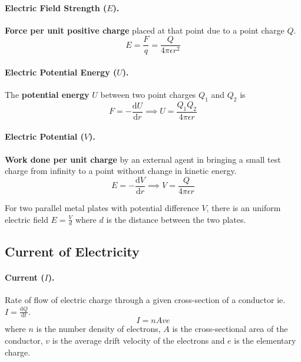 \documentclass{article}
\begin{document}
\paragraph{Electric Field Strength ($E$).} \textbf{Force per unit positive
charge} placed at that point due to a point charge $Q$. \begin{equation} E =
\frac{F}{q} = \frac{Q}{4\pi\epsilon r^2} \end{equation}

\paragraph{Electric Potential Energy ($U$).} The \textbf{potential energy} $U$
between two point charges $Q_1$ and $Q_2$ is \begin{equation} F =
-\frac{\mathrm{d}U}{\mathrm{d}r} \implies U = \frac{Q_1Q_2}{4\pi\epsilon r}
\end{equation}

\paragraph{Electric Potential ($V$).} \textbf{Work done per unit charge} by an
external agent in bringing a small test charge from infinity to a point without
change in kinetic energy. \begin{equation} E = -\frac{\mathrm{d}V}{\mathrm{d}r}
  \implies V = \frac{Q}{4\pi\epsilon r} \end{equation}

For two parallel metal plates with potential difference $V$, there is an uniform
electric field $E = \frac{V}{d}$ where $d$ is the distance between the two
plates.

\subsection{Current of Electricity}

\paragraph{Current ($I$).} Rate of flow of electric charge through a given
cross-section of a conductor ie. $I = \frac{\mathrm{d}{Q}}{\mathrm{d}t}$.
\begin{equation} I = nAve \end{equation} where $n$ is the number density of
  electrons, $A$ is the cross-sectional area of the conductor, $v$ is the
  average drift velocity of the electrons and $e$ is the elementary charge.
\end{document}
